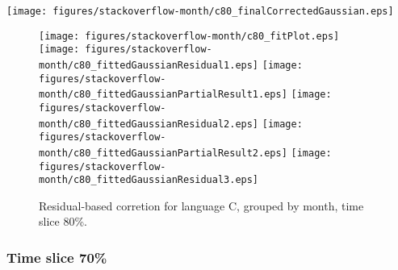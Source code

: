 \begin{center}
{\texttt{[image: figures/stackoverflow-month/c80\_finalCorrectedGaussian.eps]}}
\end{center}

\FloatBarrier

\begin{figure}[t]
\centering
{}
{\texttt{[image: figures/stackoverflow-month/c80\_fitPlot.eps]}}
{\texttt{[image: figures/stackoverflow-month/c80\_fittedGaussianResidual1.eps]}}
{\texttt{[image: figures/stackoverflow-month/c80\_fittedGaussianPartialResult1.eps]}}
{\texttt{[image: figures/stackoverflow-month/c80\_fittedGaussianResidual2.eps]}}
{\texttt{[image: figures/stackoverflow-month/c80\_fittedGaussianPartialResult2.eps]}}
{\texttt{[image: figures/stackoverflow-month/c80\_fittedGaussianResidual3.eps]}}
\caption{Residual-based corretion for language C, grouped by month, time slice 80\%.}
\end{figure}


\FloatBarrier


\subsubsection{Time slice 70\%}

